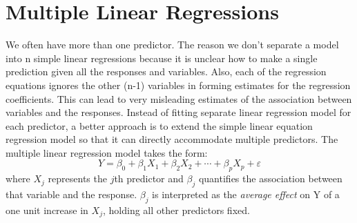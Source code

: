 \documentclass{article}
\begin{document}
\section*{Multiple Linear Regressions}
We often have more than one predictor. The reason we don't separate a model into n simple linear regressions because it is unclear how to make a single prediction given all the responses and variables. 
Also, each of the regression equations ignores the other (n-1) variables in forming estimates for the regression coefficients. This can lead to very misleading estimates of the association between variables and the responses. 
Instead of fitting separate linear regression model for each predictor, a better approach is to extend the simple linear equation regression model so that it can directly accommodate multiple predictors. The multiple linear regression model takes the form: 
\begin{equation*} Y = \beta_0 + \beta_1 X_1 + \beta_2 X_2 + \cdots + \beta_p X_p + \varepsilon \end{equation*}
where $X_j$ represents the $j$th predictor and $\beta_j$ quantifies the association between that variable and the response. $\beta_j$ is interpreted as the \textit{average effect} on Y of a one unit increase in $X_j$, holding all other predictors fixed. 
\end{document}
